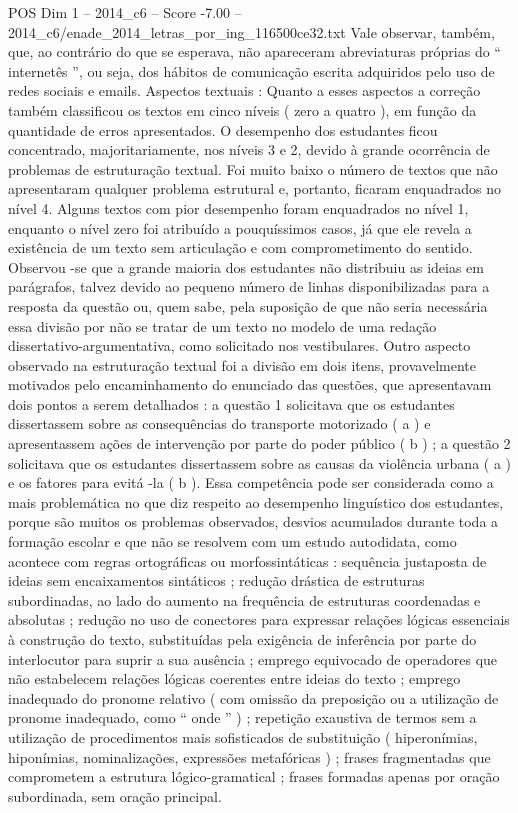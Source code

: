 \begin{textsample}{POS Dim 1 – 2014\_c6 – Score -7.00 – 2014\_c6/enade\_2014\_letras\_por\_ing\_116500ce32.txt}
Vale observar, também, que, ao contrário do que se esperava, não apareceram abreviaturas próprias do “ internetês ”, ou seja, dos hábitos de comunicação escrita adquiridos pelo uso de redes sociais e emails.
Aspectos textuais : Quanto a esses aspectos a correção também classificou os textos em cinco níveis ( zero a quatro ), em função da quantidade de erros apresentados.
O desempenho dos estudantes ficou concentrado, majoritariamente, nos níveis 3 e 2, devido à grande ocorrência de problemas de estruturação textual.
Foi muito baixo o número de textos que não apresentaram qualquer problema estrutural e, portanto, ficaram enquadrados no nível 4.
Alguns textos com pior desempenho foram enquadrados no nível 1, enquanto o nível zero foi atribuído a pouquíssimos casos, já que ele revela a existência de um texto sem articulação e com comprometimento do sentido.
Observou -se que a grande maioria dos estudantes não distribuiu as ideias em parágrafos, talvez devido ao pequeno número de linhas disponibilizadas para a resposta da questão ou, quem sabe, pela suposição de que não seria necessária essa divisão por não se tratar de um texto no modelo de uma redação dissertativo-argumentativa, como solicitado nos vestibulares.
Outro aspecto observado na estruturação textual foi a divisão em dois itens, provavelmente motivados pelo encaminhamento do enunciado das questões, que apresentavam dois pontos a serem detalhados : a questão 1 solicitava que os estudantes dissertassem sobre as consequências do transporte motorizado ( a ) e apresentassem ações de intervenção por parte do poder público ( b ) ; a questão 2 solicitava que os estudantes dissertassem sobre as causas da violência urbana ( a ) e os fatores para evitá -la ( b ).
Essa competência pode ser considerada como a mais problemática no que diz respeito ao desempenho linguístico dos estudantes, porque são muitos os problemas observados, desvios acumulados durante toda a formação escolar e que não se resolvem com um estudo autodidata, como acontece com regras ortográficas ou morfossintáticas : sequência justaposta de ideias sem encaixamentos sintáticos ; redução drástica de estruturas subordinadas, ao lado do aumento na frequência de estruturas coordenadas e absolutas ; redução no uso de conectores para expressar relações lógicas essenciais à construção do texto, substituídas pela exigência de inferência por parte do interlocutor para suprir a sua ausência ; emprego equivocado de operadores que não estabelecem relações lógicas coerentes entre ideias do texto ; emprego inadequado do pronome relativo ( com omissão da preposição ou a utilização de pronome inadequado, como “ onde ” ) ; repetição exaustiva de termos sem a utilização de procedimentos mais sofisticados de substituição ( hiperonímias, hiponímias, nominalizações, expressões metafóricas ) ; frases fragmentadas que comprometem a estrutura lógico-gramatical ; frases formadas apenas por oração subordinada, sem oração principal.

\end{textsample}
